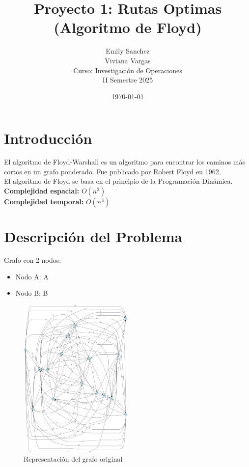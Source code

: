 \documentclass[12pt]{article}
\title{Proyecto 1: Rutas Optimas (Algoritmo de Floyd)}
\author{Emily Sanchez \\ Viviana Vargas \\[1cm] Curso: Investigación de Operaciones \\ II Semestre 2025}
\date{\today}
\begin{document}
\maketitle
\thispagestyle{empty}
\newpage
\setcounter{page}{1}

\section{Introducción}
El algoritmo de Floyd-Warshall es un algoritmo para encontrar los caminos más cortos en un grafo ponderado. Fue publicado por Robert Floyd en 1962.\\
El algoritmo de Floyd se basa en el principio de la Programación Dinámica.\\
\textbf{Complejidad espacial:} $O(n^2)$\\
\textbf{Complejidad temporal:} $O(n^3)$\\
\clearpage
\section{Descripción del Problema}
Grafo con 2 nodos:

\begin{itemize}
\item Nodo A: A
\item Nodo B: B
\end{itemize}

\begin{figure}[h!]
\centering
\includegraphics[width=0.5\textwidth,keepaspectratio]{grafo.png}
\caption{Representación del grafo original}
\end{figure}
\end{document}
